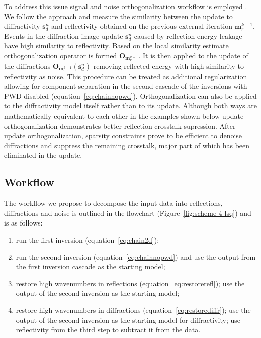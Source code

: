 To address this issue signal and noise orthogonalization workflow is employed \cite[]{chen2015random}. We follow the approach and measure the similarity between the update to diffractivity $\mathbf{s}_{d}^{n}$ and reflectivity obtained on the previous external iteration $\mathbf{m}_r^{k-1}$. Events in the diffraction image update $\mathbf{s}_{d}^{n}$ caused by reflection energy leakage have high similarity to reflectivity. Based on the local similarity estimate \cite[]{fomel2007local} orthogonalization operator
is formed $\mathbf{O}_{\mathbf{m}_r^{k-1}}$. It is then applied to the
update of the diffractions $\mathbf{O}_{\mathbf{m}_r^{k-1}}(\mathbf{s}_{d}^{n})$ removing
reflected energy with high similarity to reflectivity as noise. This procedure can be treated as additional regularization allowing for component separation
in the second cascade of the inversions with PWD disabled (equation~\ref{eq:chainnopwd}). Orthogonalization can also be applied to the diffractivity 
model itself rather than to its update. Although both ways are mathematically equivalent to each other in the examples shown below update orthogonalization 
demonstrates better reflection crosstalk supression.
After update orthogonalization, sparsity constraints prove to be efficient to denoise diffractions and suppress the remaining crosstalk, major part
of which has been eliminated in the update.

\subsection{Workflow}

The workflow we propose to decompose the input data into reflections, diffractions and noise is outlined
in the flowchart (Figure~\ref{fig:scheme-4-lsq}) and is as follows:

\begin{enumerate}
\item run the first inversion (equation~\ref{eq:chain2d});
\item run the second inversion (equation~\ref{eq:chainnopwd}) and use the output from the first
inversion cascade as the starting model;
\item restore high wavenumbers in reflections (equation~\ref{eq:restorerefl}); use the output of the second inversion as the starting model;
\item restore high wavenumbers in diffractions (equation~\ref{eq:restorediffr}); use the output of the second inversion as the starting model for
diffractivity; use reflectivity from the third step to subtract it from the data.
\end{enumerate}

